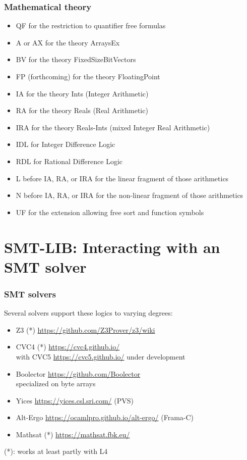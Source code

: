 \documentclass{beamer}
\begin{document}
\begin{frame}[fragile]\frametitle{Mathematical theory}

  \begin{itemize}
  \item QF for the restriction to quantifier free formulas
  \item  A or AX for the theory ArraysEx
  \item     BV for the theory FixedSizeBitVectors
  \item     FP (forthcoming) for the theory FloatingPoint
  \item     IA for the theory Ints (Integer Arithmetic)
  \item     RA for the theory Reals (Real Arithmetic)
  \item     IRA for the theory Reals-Ints (mixed Integer Real Arithmetic)
  \item     IDL for Integer Difference Logic
  \item     RDL for Rational Difference Logic
  \item     L before IA, RA, or IRA for the linear fragment of those
    arithmetics
  \item     N before IA, RA, or IRA for the non-linear fragment of those
    arithmetics
  \item     UF for the extension allowing free sort and function symbols
  \end{itemize}
  
\end{frame}



\section{SMT-LIB: Interacting with an SMT solver}


\begin{frame}[fragile]\frametitle{SMT solvers}

  Several solvers support these logics to varying degrees:

  \begin{itemize}
  \item Z3 (*) \url{https://github.com/Z3Prover/z3/wiki}
  \item CVC4 (*) \url{https://cvc4.github.io/}\\
    with CVC5 \url{https://cvc5.github.io/} under development
  \item Boolector \url{https://github.com/Boolector}\\
    specialized on byte arrays
  \item Yices \url{https://yices.csl.sri.com/} (PVS)
  \item Alt-Ergo \url{https://ocamlpro.github.io/alt-ergo/} (Frama-C)
  \item Mathsat (*) \url{https://mathsat.fbk.eu/}
  \end{itemize}

(*): works at least partly with L4
\end{frame}
\end{document}
